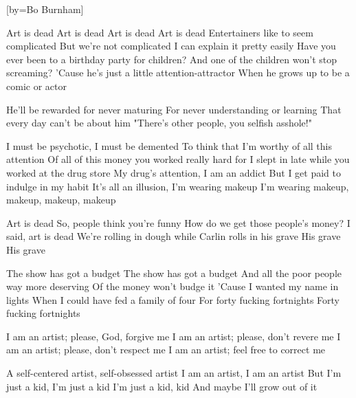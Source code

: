[by={Bo Burnham}]

\beginchorus
Art is dead
Art is dead
Art is dead
Art is dead
\endchorus
\beginverse
Entertainers like to seem complicated
But we're not complicated
I can explain it pretty easily
Have you ever been to a birthday party for children?
And one of the children won't stop screaming?
'Cause he's just a little attention-attractor
When he grows up to be a comic or actor

\endverse
\beginverse
He'll be rewarded for never maturing
For never understanding or learning
That every day can't be about him
"There's other people, you selfish asshole!"

\endverse
\beginverse
I must be psychotic, I must be demented
To think that I'm worthy of all this attention
Of all of this money you worked really hard for
I slept in late while you worked at the drug store
My drug's attention, I am an addict
But I get paid to indulge in my habit
It's all an illusion, I'm wearing makeup
I'm wearing makeup, makeup, makeup, makeup

\endverse
\beginverse
Art is dead
So, people think you're funny
How do we get those people's money?
I said, art is dead
We're rolling in dough while Carlin rolls in his grave
His grave
His grave

\endverse
\beginverse
The show has got a budget
The show has got a budget
And all the poor people way more deserving
Of the money won't budge it
'Cause I wanted my name in lights
When I could have fed a family of four
For forty fucking fortnights
Forty fucking fortnights

\endverse
\beginverse
I am an artist; please, God, forgive me
I am an artist; please, don't revere me
I am an artist; please, don't respect me
I am an artist; feel free to correct me

\endverse
\beginverse
A self-centered artist, self-obsessed artist
I am an artist, I am an artist
But I'm just a kid, I'm just a kid
I'm just a kid, kid
And maybe I'll grow out of it

\endverse
\endsong
